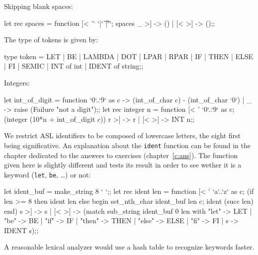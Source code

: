 Skipping blank spaces:
\begin{caml_example}
let rec spaces = function
  [< '` `|`\t`|`\n`; spaces _ >] -> ()
| [< >] -> ();;
\end{caml_example}
The type of tokens is given by:
\begin{caml_example}
type token = LET | BE | LAMBDA | DOT | LPAR | RPAR
           | IF | THEN | ELSE | FI | SEMIC
           | INT of int | IDENT of string;;
\end{caml_example}
Integers:
\begin{caml_example}
let int_of_digit = function
  `0`..`9` as c -> (int_of_char c) - (int_of_char `0`)
| _ -> raise (Failure "not a digit");;
let rec integer n = function
  [< ' `0`..`9` as c; (integer (10*n + int_of_digit c)) r >] -> r
| [< >] -> INT n;;
\end{caml_example}
We restrict ASL identifiers to be composed of lowercase letters, the
eight first being significative. An explanation about the {\tt ident}
function can be found in the chapter dedicated to the answers to
exercises (chapter~\ref{c:ans}). The function given here is slightly
different and tests its result in order to see wether it is a keyword
({\tt let}, {\tt be}, \ldots) or not:
\begin{caml_example}
let ident_buf = make_string 8 ` `;;
let rec ident len = function
  [< ' `a`..`z` as c;
     (if len >= 8 then ident len
      else begin
            set_nth_char ident_buf len c;
            ident (succ len)
           end) s >] -> s
| [< >] -> (match sub_string ident_buf 0 len
            with "let" -> LET
               | "be" -> BE
               | "if" -> IF
               | "then" -> THEN
               | "else" -> ELSE
               | "fi" -> FI
               | s -> IDENT s);;
\end{caml_example}
A reasonable lexical analyzer would use a hash table to recognize keywords
faster.

